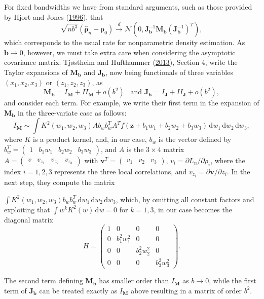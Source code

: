 \documentclass[
  12pt,
  letterpaper]{article}
\numberwithin{equation}{section}
\newcommand{\z}{\bm{z}}
\newcommand{\fv}{\bm{v}}
\newcommand{\frho}{\bm{\rho}}
\newcommand{\hfrho}{\widehat{\bm{\rho}}}
\newcommand{\hh}{\bm{b}}
\newcommand{\Jb}{\bm{J}_{\hh}}
\newcommand{\Mb}{\bm{M}_{\hh}}
\begin{document}
For fixed bandwidths we have from standard arguments, such as those provided by Hjort and Jones (\protect\hyperlink{ref-hjort1996locally}{1996}), that
\begin{equation}
\sqrt{nb^3}\left(\hfrho_n - \frho_0\right) \stackrel{d}{\rightarrow} \mathcal{N}(0, \Jb^{-1}\Mb(\Jb^{-1})^T),
\label{eq:fixed-h}
\end{equation}
which corresponds to the usual rate for nonparametric density estimation. As \(\hh\rightarrow0\), however, we must take extra care when considering the asymptotic covariance matrix. Tjøstheim and Hufthammer (\protect\hyperlink{ref-tjostheim2013local}{2013}), Section 4, write the Taylor expansions of \(\Mb\) and \(\Jb\), now being functionals of three variables \((x_1, x_2, x_3)\) or \((z_1,z_2,z_3)\), as
\[\Mb = I_{\bm{M}} + II_{\bm{M}} + o(b^2) \,\,\, \textrm{ and } \Jb = I_{\bm{J}} + II_{\bm{J}} + o(b^2),\]
and consider each term. For example, we write their first term in the expansion of \(\Mb\) in the three-variate case as follows:
\[I_{\bm{M}} \sim \int K^2(w_1, w_2, w_3)Ab_wb_w^TA^Tf(\z + b_1w_1 + b_2w_2 + b_3w_3)\,\textrm{d}w_1\,\textrm{d}w_2\,\textrm{d}w_3,\]
where \(K\) is a product kernel, and, in our case, \(b_w\) is the vector defined by \(b_w^T = \begin{pmatrix} 1 & b_1w_1 & b_2w_2 & b_3w_3 \end{pmatrix}\), and \(A\) is the \(3\times 4\) matrix \(A = \begin{pmatrix} v & v_{z_1} & v_{z_2} & v_{z_3}\end{pmatrix}\) with \(\fv^T = \begin{pmatrix} v_1 & v_2 & v_3 \end{pmatrix}\), \(v_i = \partial L_n/\partial \rho_i\), where the index \(i=1,2,3\) represents the three local correlations, and \(v_{z_i} = \partial \fv/\partial z_i\). In the next step, they compute the matrix

\noindent \(\int K^2(w_1, w_2, w_3)b_wb_w^T\,\textrm{d}w_1\,\textrm{d}w_2\,\textrm{d}w_3\), which, by omitting all constant factors and exploiting that \(\int w^k K^2(w)\,\textrm{d}w = 0\) for \(k = 1,3\), in our case becomes the diagonal matrix
\[H = \begin{pmatrix} 1 & 0 & 0 & 0 \\ 0 & b_1^2w_1^2 & 0 & 0 \\ 0 & 0 & b_2^2w_2^2 & 0 \\ 0 & 0 & 0 & b_3^2w_3^2 \end{pmatrix}.\]

The second term defining \(\Mb\) has smaller order than \(I_{\bm{M}}\) as \(b \rightarrow 0\), while the first term of \(\Jb\) can be treated exactly as \(I_{\bm{M}}\) above resulting in a matrix of order \(b^2\).
\end{document}
